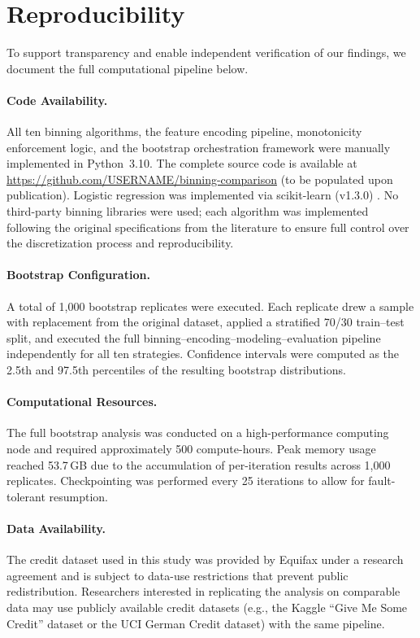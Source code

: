 \documentclass[11pt]{article}
\begin{document}
\section{Reproducibility}
\label{sec:reproducibility}

To support transparency and enable independent verification of our findings, we document the full computational pipeline below.

\paragraph{Code Availability.} All ten binning algorithms, the feature encoding pipeline, monotonicity enforcement logic, and the bootstrap orchestration framework were manually implemented in Python~3.10. The complete source code is available at \url{https://github.com/USERNAME/binning-comparison} (to be populated upon publication). Logistic regression was implemented via scikit-learn (v1.3.0) \citep{pedregosa2011scikit}. No third-party binning libraries were used; each algorithm was implemented following the original specifications from the literature to ensure full control over the discretization process and reproducibility.

\paragraph{Bootstrap Configuration.} A total of 1{,}000 bootstrap replicates were executed. Each replicate drew a sample with replacement from the original dataset, applied a stratified 70/30 train--test split, and executed the full binning--encoding--modeling--evaluation pipeline independently for all ten strategies. Confidence intervals were computed as the 2.5th and 97.5th percentiles of the resulting bootstrap distributions.

\paragraph{Computational Resources.} The full bootstrap analysis was conducted on a high-performance computing node and required approximately 500 compute-hours. Peak memory usage reached 53.7\,GB due to the accumulation of per-iteration results across 1{,}000 replicates. Checkpointing was performed every 25 iterations to allow for fault-tolerant resumption.

\paragraph{Data Availability.} The credit dataset used in this study was provided by Equifax under a research agreement and is subject to data-use restrictions that prevent public redistribution. Researchers interested in replicating the analysis on comparable data may use publicly available credit datasets (e.g., the Kaggle ``Give Me Some Credit'' dataset or the UCI German Credit dataset) with the same pipeline.
\end{document}
